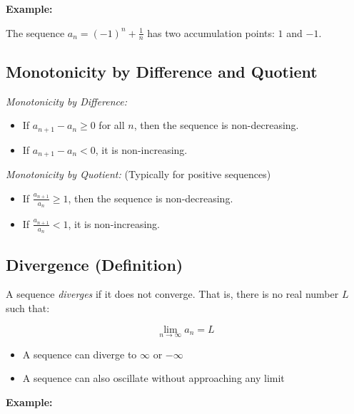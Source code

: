 \textbf{Example:}

The sequence \(a_n = {(-1)}^n + \frac{1}{n}\) has two accumulation points: \(1\) and \(-1\).

\subsection{Monotonicity by Difference and Quotient}

\emph{Monotonicity by Difference:}

\begin{itemize}

    \item If \(a_{n+1} - a_n \ge 0\) for all \(n\), then the sequence is non-decreasing.

    \item If \(a_{n+1} - a_n < 0\), it is non-increasing.

\end{itemize}

\emph{Monotonicity by Quotient:} (Typically for positive sequences)

\begin{itemize}

    \item If \(\frac{a_{n+1}}{a_n} \ge 1\), then the sequence is non-decreasing.

    \item If \(\frac{a_{n+1}}{a_n} < 1\), it is non-increasing.

\end{itemize}

\subsection{Divergence (Definition)}

A sequence \emph{diverges} if it does not converge. That is, there is no real number \(L\) such that:

\[
    \lim_{n \to \infty} a_n = L
\]

\begin{itemize}

    \item A sequence can diverge to \(\infty\) or \(-\infty\)

    \item A sequence can also oscillate without approaching any limit

\end{itemize}

\textbf{Example:}

